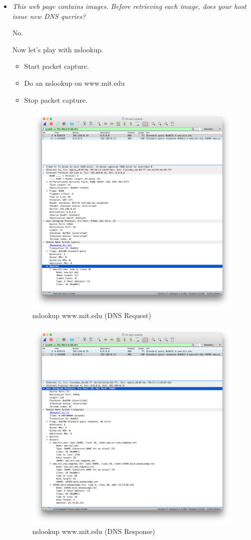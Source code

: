 \documentclass[11pt]{article}
\begin{document}
\begin{itemize}
	\item
		\textit{This web page contains images. Before retrieving each image, does your host issue new DNS queries?}
		\par No.
		
\pagebreak

\par Now let’s play with nslookup.
\begin{itemize}
	\item Start packet capture.
	\item Do an nslookup on www.mit.edu
	\item Stop packet capture.
\end{itemize}

		\begin{figure}[H]
		\centering
		\caption{nslookup www.mit.edu (DNS Request)}
		\includegraphics[width=400px]{09}
		\end{figure}
		
		\begin{figure}[H]
		\centering
		\caption{nslookup www.mit.edu (DNS Response)}
		\includegraphics[width=400px]{10}
		\end{figure}


\end{itemize}
\end{document}
